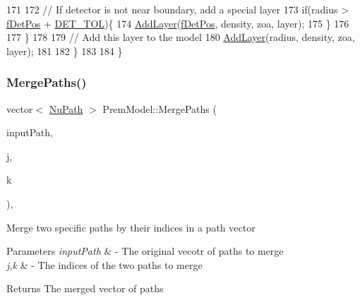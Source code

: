 \begin{DoxyCode}
171 
172       \textcolor{comment}{// If detector is not near boundary, add a special layer}
173       \textcolor{keywordflow}{if}(radius > \hyperlink{classOscProb_1_1PremModel_ab12ea0343cd11b9233ffd20ab5e620c7}{fDetPos} + \hyperlink{classOscProb_1_1PremModel_a8ad1335ebe80ee1cd1cdf59d774ab34b}{DET\_TOL})\{
174         \hyperlink{classOscProb_1_1PremModel_a08c337b84138adc46ee4dd002e9262d2}{AddLayer}(\hyperlink{classOscProb_1_1PremModel_ab12ea0343cd11b9233ffd20ab5e620c7}{fDetPos}, density, zoa, layer);
175       \}
176 
177     \}
178 
179     \textcolor{comment}{// Add this layer to the model}
180     \hyperlink{classOscProb_1_1PremModel_a08c337b84138adc46ee4dd002e9262d2}{AddLayer}(radius, density, zoa, layer);
181 
182   \}
183   
184 \}
\end{DoxyCode}
\mbox{\label{classOscProb_1_1PremModel_a87cb8043b58fde2c8a8779e6ae1b5135}} 
\subsubsection{\texorpdfstring{Merge\+Paths()}{MergePaths()}}
{\footnotesize\ttfamily vector$<$ \hyperlink{structOscProb_1_1NuPath}{Nu\+Path} $>$ Prem\+Model\+::\+Merge\+Paths (\begin{DoxyParamCaption}\item[{std\+::vector$<$ \hyperlink{structOscProb_1_1NuPath}{Osc\+Prob\+::\+Nu\+Path} $>$}]{input\+Path,  }\item[{int}]{j,  }\item[{int}]{k }\end{DoxyParamCaption})\hspace{0.3cm}{\ttfamily [protected]}, {\ttfamily [virtual]}}

Merge two specific paths by their indices in a path vector


\begin{DoxyParams}{Parameters}
{\em input\+Path} & -\/ The original vecotr of paths to merge \\
\hline
{\em j,k} & -\/ The indices of the two paths to merge \\
\hline
\end{DoxyParams}
\begin{DoxyReturn}{Returns}
The merged vector of paths 
\end{DoxyReturn}


